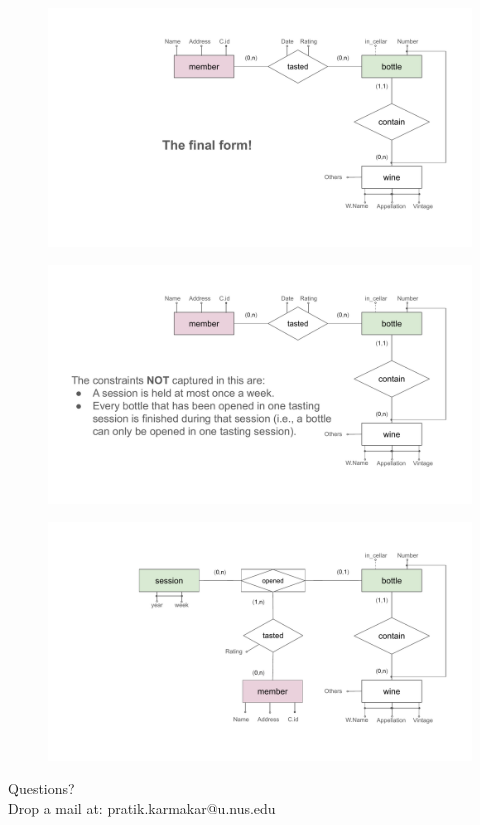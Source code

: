 \documentclass{beamer}
\begin{document}
\begin{frame}
    \begin{figure}
        \centering
        \includegraphics[width=1.1\linewidth]{tut_02_files/19.pdf}
    \end{figure}
\end{frame}

\begin{frame}
    \begin{figure}
        \centering
        \includegraphics[width=1.1\linewidth]{tut_02_files/20.pdf}
    \end{figure}
\end{frame}

\begin{frame}
    \begin{figure}
        \centering
        \includegraphics[width=1.1\linewidth]{tut_02_files/21.pdf}
    \end{figure}
\end{frame}

\begin{frame}
\begin{center}
Questions?\\
Drop a mail at: pratik.karmakar@u.nus.edu
\end{center}
\end{frame}
\end{document}
